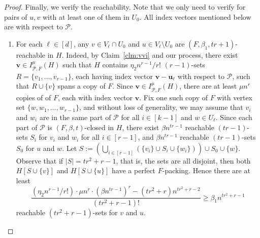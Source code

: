 \documentclass[11pt, letterpaper]{amsart}
\theoremstyle{plain}
\numberwithin{equation}{section}
\theoremstyle{definition}
\newcommand\card[1]{\left| #1 \right|}
\renewcommand{\vec}[1]{{\mathbf #1}}
\begin{document}
\begin{proof}
Finally, we verify the reachability. Note that we only need to verify for pairs of \(u,v\) with at least one of them in \(U_0\). All index vectors mentioned below are with respect to \(\mathcal{P}\).
\begin{enumerate}
\item For each \(\ell\in [d]\), any $ v\in V_\ell\cap U_0 $ and $ u\in V_\ell\setminus U_0 $ are $ (F,\beta_1,tr+1) $-reachable in $ H $.  
Indeed, by Claim~\ref{clm:vvi} and our process, there exist $\vec{v}\in I_{\mathcal P, F}^{\mu}(H)$ such that $H$ contains \(\eta_2 n^{r-1}/r!\) \((r-1)\)-sets \(R=\{v_1,\dots,v_{r-1}\} \), each having index vector \(\vec{v}-\vec{u}_{\ell}\) with respect to \(\mathcal{P}\), such that \(R\cup \{v\}\) spans a copy of \(F\). Since \(\vec{v}\in I_{\mathcal P, F}^{\mu}(H)\), there are at least \(\mu n^r\) copies of of $F$, each with index vector \(\vec{v}\). 
Fix one such copy of $F$ with vertex set $\{w, w_1,\dots, w_{r-1}\}$, and without loss of generality, we may assume that $ v_i $ and $ w_i $ are in the same part of $\mathcal{P}$ for all $ i\in[k-1] $ and $ w\in U_\ell $. 
Since each part of \(\mathcal{P}\) is $ (F,\beta,t) $-closed in $ H $, there exist $\beta n^{tr-1}$ reachable $ (tr-1) $-sets \(S_i\) for $ v_i $ and $ w_i $ for all $ i\in [r-1]$, and $\beta n^{tr-1}$ reachable $ (tr-1) $-sets \(S_0\) for $ u $ and $ w $. 
Let \(S:=\left(\bigcup_{i\in [r-1]}\left(\{v_i\}\cup S_i\cup \{w_i\}\right)\right)\cup S_0\cup \{w\}\). 
Observe that if \(\card{S}=tr^2+r-1\), that is, the sets are all disjoint, then both \(H[S\cup \{v\}]\) and \(H[S\cup \{u\}]\) have a perfect \(F\)-packing. 
Hence there are at least
\[
\frac{(\eta_2n^{r-1}/r!)\cdot\mu n^r \cdot{(\beta n^{tr-1})}^r-(tr^2+r)n^{tr^2+r-2}}{(tr^2+r-1)!}\ge \beta_1 n^{tr^2+r-1}
\]
reachable $ (tr^2+r-1) $-sets for $ v $ and $ u $.
            

\end{enumerate}
\end{proof}
\end{document}
